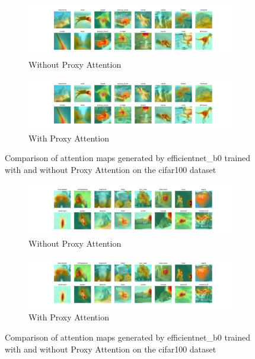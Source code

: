     \begin{figure}[H]
        \centering
        \begin{subfigure}[b]{1\textwidth}
            \includegraphics[width=\textwidth]{images/cifar100_efficientnet_b0_noproxy_2.pdf}
            \caption{Without Proxy Attention}
        \end{subfigure}
        \hfill
        \begin{subfigure}[b]{1\textwidth}
            \includegraphics[width=\textwidth]{images/cifar100_efficientnet_b0_proxy_2.pdf}
            \caption{With Proxy Attention}
        \end{subfigure}
        \caption{Comparison of attention maps generated by efficientnet\_b0 trained with and without Proxy Attention on the cifar100 dataset}
    \end{figure}
    

    \begin{figure}[H]
        \centering
        \begin{subfigure}[b]{1\textwidth}
            \includegraphics[width=\textwidth]{images/cifar100_efficientnet_b0_noproxy_3.pdf}
            \caption{Without Proxy Attention}
        \end{subfigure}
        \hfill
        \begin{subfigure}[b]{1\textwidth}
            \includegraphics[width=\textwidth]{images/cifar100_efficientnet_b0_proxy_3.pdf}
            \caption{With Proxy Attention}
        \end{subfigure}
        \caption{Comparison of attention maps generated by efficientnet\_b0 trained with and without Proxy Attention on the cifar100 dataset}
    \end{figure}
    
